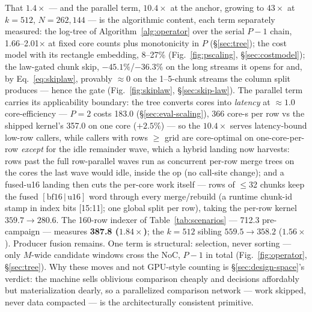 That $1.4\times$ --- and the parallel term, $10.4\times$ at the anchor,
growing to $43\times$ at $k{=}512$, $N{=}262{,}144$ --- is the
algorithmic content, each term
separately measured: the log-tree of Algorithm~\ref{alg:operator} over
the serial $P{-}1$ chain,
1.66--2.01$\times$ at fixed core counts plus monotonicity in $P$
(\S\ref{sec:tree}); the cost model with its rectangle embedding,
8--27\% (Fig.~\ref{fig:pscaling}, \S\ref{sec:costmodel}); the law-gated
chunk skip, $-45.1\%$/$-36.3\%$ on the long streams it opens for and,
by Eq.~\ref{eq:skiplaw}, provably ${\approx}0$ on the 1--5-chunk
streams the column split produces --- hence the gate
(Fig.~\ref{fig:skiplaw}, \S\ref{sec:skip-law}).
The parallel term carries its applicability boundary: the tree
converts cores into \emph{latency} at ${\approx}1.0$ core-efficiency
--- $P{=}2$ costs 183.0\us{} (\S\ref{sec:eval-scaling}), 366
core-\textmu s per row vs the shipped kernel's 357.0 on one core
($+2.5\%$) --- so the $10.4\times$ serves latency-bound low-row
callers, while callers with rows ${\geq}$ grid are core-optimal on
one-core-per-row \emph{except} for the idle remainder wave, which a
hybrid landing now harvests: rows past the full row-parallel waves run
as concurrent per-row merge trees on the cores the last wave would
idle, inside the op (no call-site change); and a fused-u16 landing then
cuts the per-core work itself --- rows of $\leq$32 chunks keep the fused
$[\text{bf16}\,|\,\text{u16}]$ word through every merge/rebuild (a
runtime chunk-id stamp in index bits [15:11]; one global split per row),
taking the per-row kernel $359.7 \to 280.6$\us{}. The 160-row indexer
of Table~\ref{tab:scenarios} --- 712.3\us{} pre-campaign --- measures
\textbf{387.8\us{} ($1.84\times$)}; the $k{=}512$ sibling
$559.5 \to 358.2$\us{} ($1.56\times$). Producer fusion remains.
One term is structural: selection, never sorting --- only
$M$-wide candidate windows cross the NoC, $P{-}1$ in total
(Fig.~\ref{fig:operator}, \S\ref{sec:tree}). Why these moves and not
GPU-style counting is \S\ref{sec:design-space}'s verdict: the machine
sells oblivious comparison cheaply and decisions
affordably but materialization dearly, so a parallelized comparison
network --- work skipped, never data compacted --- is the
architecturally consistent primitive.

